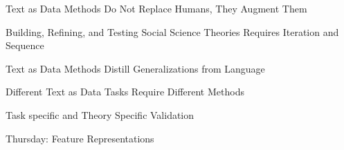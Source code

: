\documentclass{beamer}
\numberwithin{equation}{section}
\begin{document}
\begin{frame}

\huge 

Text as Data Methods Do Not Replace Humans, They Augment Them


\end{frame}


\begin{frame}

\huge 

Building, Refining, and Testing Social Science Theories Requires Iteration and Sequence



\end{frame}

\begin{frame}

\huge 
Text as Data Methods Distill Generalizations from Language  


\end{frame}


\begin{frame}

\huge 

Different Text as Data Tasks Require Different Methods

\end{frame}






\begin{frame}
\huge 

Task specific and Theory Specific Validation
\end{frame}



\begin{frame}

\huge 

Thursday: Feature Representations


\end{frame}
\end{document}
